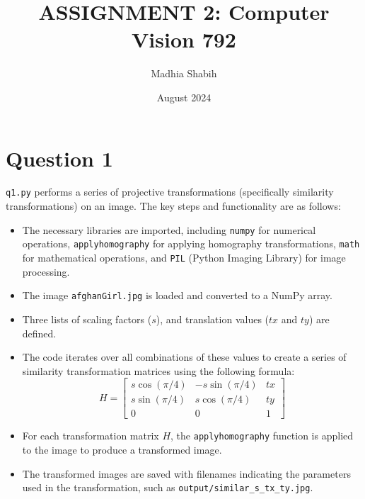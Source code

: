 \documentclass{article}
\title{ASSIGNMENT 2: Computer Vision 792}
\author{Madhia Shabih}
\date{August 2024}
\begin{document}
\maketitle
\section{Question 1}

\texttt{q1.py} performs a series of projective transformations (specifically similarity transformations) on an image. The key steps and functionality are as follows:

\begin{itemize}
    \item The necessary libraries are imported, including \texttt{numpy} for numerical operations, \texttt{applyhomography} for applying homography transformations, \texttt{math} for mathematical operations, and \texttt{PIL} (Python Imaging Library) for image processing.
    \item The image \texttt{afghanGirl.jpg} is loaded and converted to a NumPy array.
    \item Three lists of scaling factors ($s$), and translation values ($tx$ and $ty$) are defined.
    \item The code iterates over all combinations of these values to create a series of similarity transformation matrices using the following formula:
    \[
    H = \begin{bmatrix}
    s \cos(\pi/4) & -s \sin(\pi/4) & tx \\
    s \sin(\pi/4) & s \cos(\pi/4) & ty \\
    0 & 0 & 1
    \end{bmatrix}
    \]
    \item For each transformation matrix $H$, the \texttt{applyhomography} function is applied to the image to produce a transformed image.
    \item The transformed images are saved with filenames indicating the parameters used in the transformation, such as \texttt{output/similar\_s\_tx\_ty.jpg}.
\end{itemize}
\end{document}
